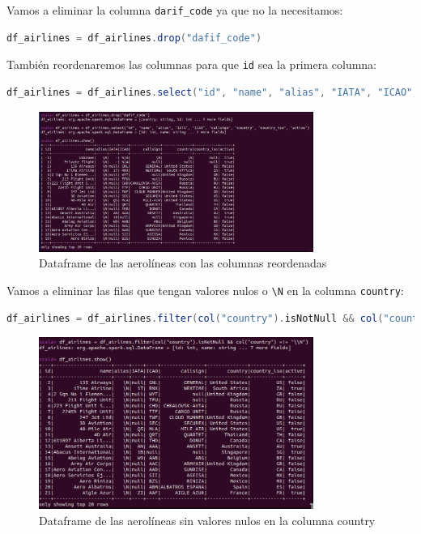 Vamos a eliminar la columna \texttt{darif_code} ya que no la necesitamos:

\begin{lstlisting}[language=scala]
df_airlines = df_airlines.drop("dafif_code")
\end{lstlisting}

También reordenaremos las columnas para que \texttt{id} sea la primera columna:

\begin{lstlisting}[language=scala]
df_airlines = df_airlines.select("id", "name", "alias", "IATA", "ICAO", "callsign", "country", "country_iso", "active")
\end{lstlisting}

\begin{figure}[H]
    \centering
    \includegraphics[width=0.8\textwidth]{figures/39.png}
    \caption{Dataframe de las aerolíneas con las columnas reordenadas}
    \label{fig:airlines_reordered_df}
\end{figure}

Vamos a eliminar las filas que tengan valores nulos o \texttt{\textbackslash N} en la columna \texttt{country}:

\begin{lstlisting}[language=scala]
df_airlines = df_airlines.filter(col("country").isNotNull && col("country") =!= "\\N"))
\end{lstlisting}

\begin{figure}[H]
    \centering
    \includegraphics[width=0.8\textwidth]{figures/40.png}
    \caption{Dataframe de las aerolíneas sin valores nulos en la columna country}
    \label{fig:airlines_no_null_df}
\end{figure}

